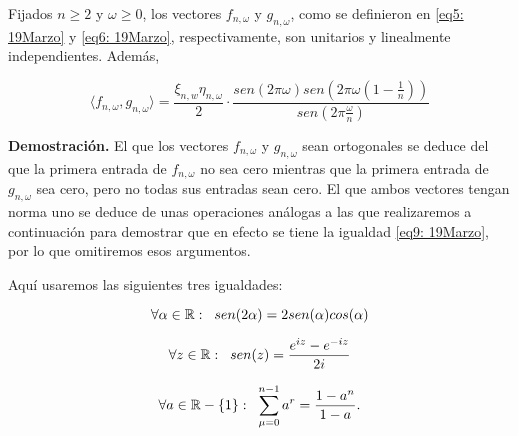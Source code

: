\begin{prop}
Fijados $n \geq 2$ y $\omega \geq 0$, los vectores
$f_{n, \omega}$ y $g_{n, \omega}$, como se definieron
en \eqref{eq5: 19Marzo}
y \eqref{eq6: 19Marzo}, respectivamente, 
son unitarios y linealmente independientes.
Además, 

\begin{equation}
\label{eq9: 19Marzo}
\langle f_{n, \omega} , g_{n, \omega} \rangle =
\frac{\xi_{n, w} \eta_{n, \omega}}{2} \cdot 
\frac{sen(2 \pi \omega)
sen(2 \pi \omega \left( 1- \frac{1}{n} \right))}{sen \left(2 \pi 
\frac{\omega}{n} \right)}
\end{equation}

\end{prop}
\noindent
\textbf{Demostración.}
El que los
vectores $f_{n, \omega}$ y $g_{n, \omega}$ sean ortogonales
se deduce del que la primera entrada de $f_{n, \omega}$ no sea cero
mientras que la primera entrada de $g_{n, \omega}$ sea cero, pero no
todas sus entradas sean cero. El que ambos vectores tengan norma
uno se deduce de unas operaciones análogas a las que realizaremos a
continuación para demostrar que en efecto se tiene la igualdad 
\eqref{eq9: 19Marzo}, por lo que omitiremos esos argumentos.


Aquí usaremos las siguientes tres igualdades:

\begin{equation}
\label{eq10: 19Marzo}
\forall \alpha \in \mathbb{R}: \hspace{0.2cm}
sen(2 \alpha) = 2 sen(\alpha) cos(\alpha)
\end{equation}



\begin{equation}
\label{eq11: 19Marzo}
\forall z\in \mathbb{R}: \hspace{0.2cm}
sen(z)= \frac{e^{iz}-e^{-iz}}{2i}
\end{equation}



\begin{equation}
\label{eq12: 19Marzo}
\forall a \in \mathbb{R}-\{ 1 \}: \hspace{0.2cm}
\sum\limits_{\mu=0}^{n-1}a^{r}= \frac{1-a^{n}}{1-a}.
\end{equation}


